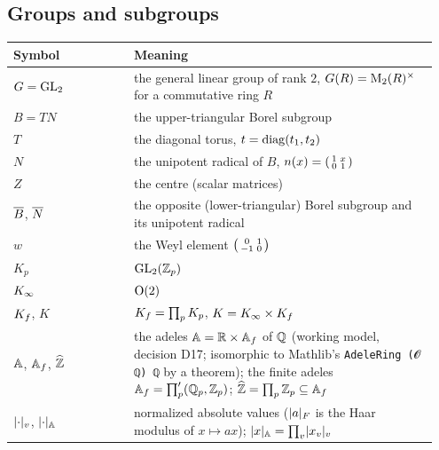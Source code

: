 
\subsection*{Groups and subgroups}
\begin{longtable}{@{}p{0.27\linewidth}p{0.68\linewidth}@{}}
\toprule
Symbol & Meaning \\ \midrule
\endhead
$G=\mathrm{GL}_2$ & the general linear group of rank $2$, $G(R)=\mathrm{M}_2(R)^\times$ for a commutative ring $R$ \\
$B=TN$ & the upper-triangular Borel subgroup \\
$T$ & the diagonal torus, $t=\operatorname{diag}(t_1,t_2)$ \\
$N$ & the unipotent radical of $B$, $n(x)=\begin{psmallmatrix}1&x\\0&1\end{psmallmatrix}$ \\
$Z$ & the centre (scalar matrices) \\
$\overline{B}$, $\overline{N}$ & the opposite (lower-triangular) Borel subgroup and its unipotent radical \\
$w$ & the Weyl element $\begin{psmallmatrix}0&1\\-1&0\end{psmallmatrix}$ \\
$K_p$ & $\mathrm{GL}_2(\mathbb{Z}_p)$ \\
$K_\infty$ & $\mathrm{O}(2)$ \\
$K_f$, $K$ & $K_f=\prod_p K_p$, $K=K_\infty\times K_f$ \\
$\mathbb{A}$, $\mathbb{A}_f$, $\widehat{\mathbb{Z}}$ & the adeles $\mathbb{A}=\mathbb{R}\times\mathbb{A}_f$ of $\mathbb{Q}$ (working model, decision D17; isomorphic to Mathlib's
  \texttt{AdeleRing (𝓞 ℚ) ℚ} by a theorem); the finite adeles $\mathbb{A}_f=\prod'_p(\mathbb{Q}_p,\mathbb{Z}_p)$; $\widehat{\mathbb{Z}}=\prod_p\mathbb{Z}_p\subseteq\mathbb{A}_f$ \\
$\lvert\cdot\rvert_v$, $\lvert\cdot\rvert_{\mathbb{A}}$ & normalized absolute values ($\lvert a\rvert_F$ is the Haar modulus of $x\mapsto ax$);
  $\lvert x\rvert_{\mathbb{A}}=\prod_v\lvert x_v\rvert_v$ \\

\end{longtable}
